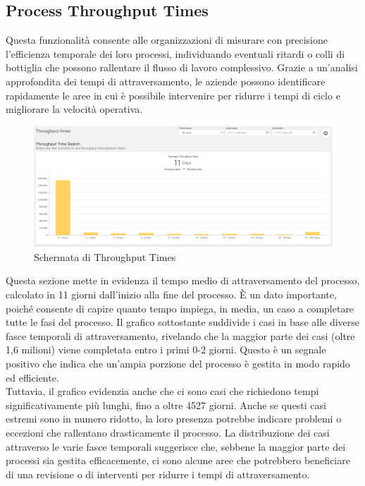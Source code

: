 \documentclass{article}
\begin{document}
\subsection{Process Throughput Times}
Questa funzionalità consente alle organizzazioni di misurare con precisione l'efficienza temporale dei loro processi, individuando eventuali ritardi o colli di bottiglia che possono rallentare il flusso di lavoro complessivo. Grazie a un'analisi approfondita dei tempi di attraversamento, le aziende possono identificare rapidamente le aree in cui è possibile intervenire per ridurre i tempi di ciclo e migliorare la velocità operativa.\\
\begin{figure}[H]
    \centering
    \includegraphics[width=\textwidth]{imgCelonis/DatiReali/ProcessThroughputTimes1.png}
    \caption{Schermata di Throughput Times}
    \label{fig:schermata-Throughput-Times}
\end{figure}
Questa sezione mette in evidenza il tempo medio di attraversamento del processo, calcolato in 11 giorni dall'inizio alla fine del processo. È un dato importante, poiché consente di capire quanto tempo impiega, in media, un caso a completare tutte le fasi del processo. Il grafico sottostante suddivide i casi in base alle diverse fasce temporali di attraversamento, rivelando che la maggior parte dei casi (oltre 1,6 milioni) viene completata entro i primi 0-2 giorni. Questo è un segnale positivo che indica che un'ampia porzione del processo è gestita in modo rapido ed efficiente.\\
Tuttavia, il grafico evidenzia anche che ci sono casi che richiedono tempi significativamente più lunghi, fino a oltre 4527 giorni. Anche se questi casi estremi sono in numero ridotto, la loro presenza potrebbe indicare problemi o eccezioni che rallentano drasticamente il processo. La distribuzione dei casi attraverso le varie fasce temporali suggerisce che, sebbene la maggior parte dei processi sia gestita efficacemente, ci sono alcune aree che potrebbero beneficiare di una revisione o di interventi per ridurre i tempi di attraversamento.\\
\end{document}
